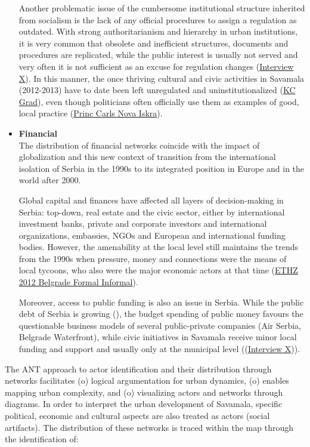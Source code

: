\documentclass[11pt]{report}
\begin{document}
\begin{itemize}
Another problematic issue of the cumbersome institutional structure inherited from socialism is the lack of any official procedures to assign a regulation as outdated.
With strong authoritarianism and hierarchy in urban institutions, it is very common that obsolete and inefficient structures, documents and procedures are replicated, while the public interest is usually not served and very often it is not sufficient as an excuse for regulation changes  (\href{InterviewX}{Interview X}).
In this manner, the once thriving cultural and civic activities in Savamala (2012-2013) have to date been left unregulated and uninstitutionalized (\href{ref}{KC Grad}), even though politicians often officially use them as examples of good, local practice (\href{ref}{Princ Carls Nova Iskra}).
\\

\item \textbf{Financial}
\\
The distribution of financial networks coincide with the impact of globalization and this new context of transition from the international isolation of Serbia in the 1990s to its integrated position in Europe and in the world after 2000.

Global capital and finances have affected all layers of decision-making in Serbia: top-down, real estate and the civic sector, either by international investment banks, private and corporate investors and international organizations, embassies, NGOs and European and international funding bodies.
However, the amenability at the local level still maintains the trends from the 1990s when pressure, money and connections were the means of local tycoons, who also were the major economic actors at that time (\href{ref}{ETHZ 2012 Belgrade Formal Informal}).

Moreover, access to public funding is also an issue in Serbia.
While the public debt of Serbia is growing (\href{MF}{\citealt{RS Ministarstvo finansija 2016}}),
the budget spending of public money favours the questionable business models of several public-private companies (Air Serbia, Belgrade Waterfront), while civic initiatives in Savamala receive minor local funding and support and usually only at the municipal level ((\href{InterviewX}{Interview X})).
\end{itemize}

The ANT approach to actor identification and their distribution through networks facilitates
(o) logical argumentation for urban dynamics,
(o) enables mapping urban complexity, and
(o) visualizing actors and networks through diagrams.
In order to interpret the urban development of Savamala, specific political, economic and cultural aspects are also treated as actors (social artifacts).
The distribution of these networks is traced within the map through the identification of:
\end{document}
